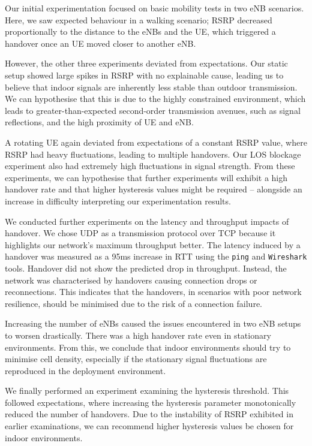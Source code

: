 Our initial experimentation focused on basic mobility tests in two eNB scenarios. Here, we saw expected behaviour in a walking scenario; RSRP decreased proportionally to the distance to the eNBs and the UE, which triggered a handover once an UE moved closer to another eNB. 

However, the other three experiments deviated from expectations. Our static setup showed large spikes in RSRP with no explainable cause, leading us to believe that indoor signals are inherently less stable than outdoor transmission. We can hypothesise that this is due to the highly constrained environment, which leads to greater-than-expected second-order transmission avenues, such as signal reflections, and the high proximity of UE and eNB.

A rotating UE again deviated from expectations of a constant RSRP value, where RSRP had heavy fluctuations, leading to multiple handovers. Our LOS blockage experiment also had extremely high fluctuations in signal strength. From these experiments, we can hypothesise that further experiments will exhibit a high handover rate and that higher hysteresis values might be required -- alongside an increase in difficulty interpreting our experimentation results.

We conducted further experiments on the latency and throughput impacts of handover. We chose UDP as a transmission protocol over TCP because it highlights our network's maximum throughput better. The latency induced by a handover was measured as a 95ms increase in RTT using the \texttt{ping} and \texttt{Wireshark} tools. Handover did not show the predicted drop in throughput. Instead, the network was characterised by handovers causing connection drops or reconnections. This indicates that the handovers, in scenarios with poor network resilience, should be minimised due to the risk of a connection failure.

Increasing the number of eNBs caused the issues encountered in two eNB setups to worsen drastically. There was a high handover rate even in stationary environments. From this, we conclude that indoor environments should try to minimise cell density, especially if the stationary signal fluctuations are reproduced in the deployment environment.

We finally performed an experiment examining the hysteresis threshold. This followed expectations, where increasing the hysteresis parameter monotonically reduced the number of handovers. Due to the instability of RSRP exhibited in earlier examinations, we can recommend higher hysteresis values be chosen for indoor environments.

